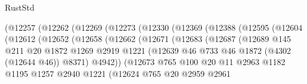 \begin{lexlean}{RustStd}
\begin{coremodule}
                    (@12257
                      (@12262
                        (@12269
                          (@12273
                            (@12330
                              (@12369
                                (@12388
                                  (@12595
                                    (@12604
                                      (@12612
                                        (@12652
                                          (@12658
                                            (@12662
                                              (@12671
                                                (@12683
                                                  (@12687
                                                    (@12689
                                                      @145
                                                      @211
                                                      @20
                                                      @1872
                                                      @1269
                                                      @2919
                                                      @1221
                                                      (@12639
                                                        @46
                                                        @733
                                                        @46
                                                        @1872
                                                        (@4302 (@12644 @46))
                                                        @8371)
                                                      @4942))
                                                  (@12673
                                                    @765
                                                    @100
                                                    @20
                                                    @11
                                                    @2963
                                                    @1182
                                                    @1195
                                                    @1257
                                                    @2940
                                                    @1221
                                                    (@12624
                                                      @765
                                                      @20
                                                      @2959
                                                      @2961

\end{coremodule}
\end{lexlean}
